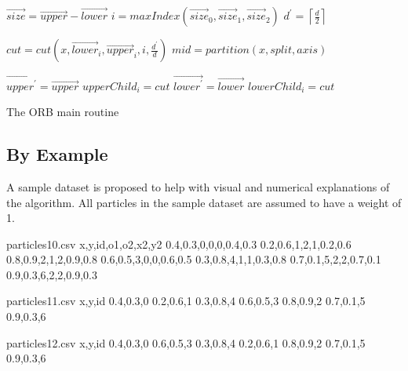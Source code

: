 \documentclass[]{article}
\begin{document}
\begin{algorithm}[H]
 	\begin{algorithmic}[1]
 		\State \Return	{}	
 		\EndIf
 		\State $\vec{size} = \vec{upper} - \vec{lower}$
 		\State $i = maxIndex(\vec{size}_0, \vec{size}_1, \vec{size}_2)$ 
 		\newline
 		\State $d^\prime = \left \lceil\frac{d}{2} \right \rceil$
 		
 		\State $cut = cut(x, \vec{lower}_{i}, \vec{upper}_{i}, i, \frac{d^\prime}{d} )$
 		\State $mid = partition(x, split, axis)$ 
 		\newline
 		
 		\State $\vec{upper^\prime} = \vec{upper}$
 		\State $upperChild_{i} = cut$
 		\State $\vec{lower^\prime} = \vec{lower}$
 		\State $lowerChild_{i} = cut$
 		\newline
 		
 		\State {} 
 		\State {}
 		\EndProcedure
 	\end{algorithmic}
 	\caption{The ORB main routine}\label{proc:orbmain}
\end{algorithm}



\subsection{By Example}

A sample dataset is proposed to help with visual and numerical explanations of the algorithm. All particles in the sample dataset are assumed to have a weight of 1.

\begin{filecontents*}{particles10.csv}
	x,y,id,o1,o2,x2,y2
	0.4,0.3,0,0,0,0.4,0.3
	0.2,0.6,1,2,1,0.2,0.6
	0.8,0.9,2,1,2,0.9,0.8
	0.6,0.5,3,0,0,0.6,0.5
	0.3,0.8,4,1,1,0.3,0.8
	0.7,0.1,5,2,2,0.7,0.1
	0.9,0.3,6,2,2,0.9,0.3
\end{filecontents*}

\begin{filecontents*}{particles11.csv}
	x,y,id
	0.4,0.3,0
	0.2,0.6,1
	0.3,0.8,4
	0.6,0.5,3
	0.8,0.9,2
	0.7,0.1,5
	0.9,0.3,6
\end{filecontents*}


\begin{filecontents*}{particles12.csv}
	x,y,id
	0.4,0.3,0
	0.6,0.5,3
	0.3,0.8,4
	0.2,0.6,1
	0.8,0.9,2
	0.7,0.1,5
	0.9,0.3,6
\end{filecontents*}
\end{document}
